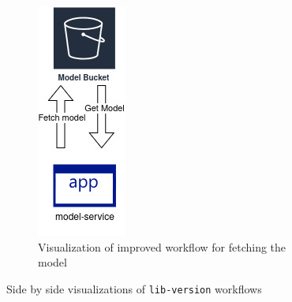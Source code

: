 \begin{figure}[t]
\begin{subfigure}[b]{0.45\linewidth}
        \includegraphics[width=0.35\linewidth]{images/improved_fetch.jpg}
        \caption{Visualization of improved workflow for fetching the model}
        \label{fig:libversion-workflow2}
    \end{subfigure}
    \caption{Side by side visualizations of \texttt{lib-version} workflows}
    \label{fig:fetch-model-workflows}
\end{figure}